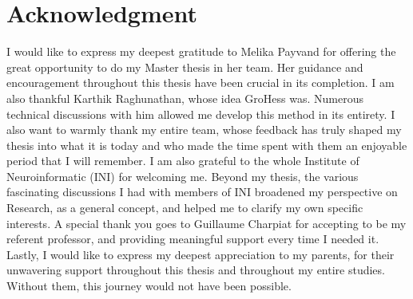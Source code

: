 \documentclass[11pt]{article}
\begin{document}
\section{Acknowledgment}



I would like to express my deepest gratitude to Melika Payvand for offering the great opportunity to do my Master thesis in her team. Her guidance and encouragement throughout this thesis have been crucial in its completion. I am also thankful Karthik Raghunathan, whose idea GroHess was. Numerous technical discussions with him allowed me develop this method in its entirety. I also want to warmly thank my entire team, whose feedback has truly shaped my thesis into what it is today and who made the time spent with them an enjoyable period that I will remember. I am also grateful to the whole Institute of Neuroinformatic (INI) for welcoming me. Beyond my thesis, the various fascinating discussions I had with members of INI broadened my perspective on Research, as a general concept, and helped me to clarify my own specific interests. A special thank you goes to Guillaume Charpiat for accepting to be my referent professor, and providing meaningful support every time I needed it. Lastly, I would like to express my deepest appreciation to my parents, for their unwavering support throughout this thesis and throughout my entire studies. Without them, this journey would not have been possible.



\printbibliography
\end{document}
